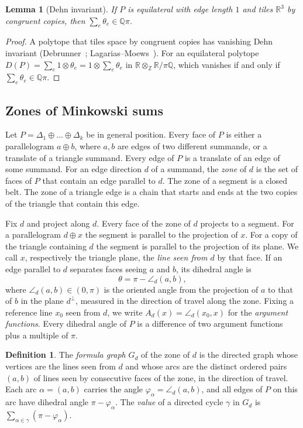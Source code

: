 \documentclass[11pt]{amsart}
\newtheorem{lemma}[thm]{Lemma}
\theoremstyle{definition}
\newtheorem{definition}[thm]{Definition}
\newcommand{\R}{\mathbb{R}}
\newcommand{\Q}{\mathbb{Q}}
\newcommand{\Z}{\mathbb{Z}}
\newcommand{\msum}{\oplus}
\begin{document}
\begin{lemma}[Dehn invariant]\label{lem:dehn}
If $P$ is equilateral with edge length $1$ and tiles $\R^3$ by congruent copies, then $\sum_e \theta_e \in \Q\pi$.
\end{lemma}
\begin{proof}
A polytope that tiles space by congruent copies has vanishing Dehn invariant (Debrunner~\cite{Deb80};
Lagarias--Moews~\cite{LM95}). For an equilateral polytope $D(P)=\sum_e 1\otimes\theta_e = 1\otimes\sum_e\theta_e$ in
$\R\otimes_\Z \R/\pi\Q$, which vanishes if and only if $\sum_e\theta_e\in\Q\pi$.
\end{proof}

\subsection{Zones of Minkowski sums}\label{sec:zones}
Let $P = \Delta_1\msum\dots\msum\Delta_k$ be in general position. Every face of $P$ is either a parallelogram
$a\msum b$, where $a,b$ are edges of two different summands, or a translate of a triangle summand. Every edge of $P$
is a translate of an edge of some summand. For an edge direction $d$ of a summand, the \emph{zone} of $d$ is the set of
faces of $P$ that contain an edge parallel to $d$. The zone of a segment is a closed belt. The zone of a triangle edge
is a chain that starts and ends at the two copies of the triangle that contain this edge.

Fix $d$ and project along $d$. Every face of the zone of $d$ projects to a segment. For a parallelogram $d\msum x$ the
segment is parallel to the projection of $x$. For a copy of the triangle containing $d$ the segment is parallel to the
projection of its plane. We call $x$, respectively the triangle plane, the \emph{line seen from $d$} by that face. If
an edge parallel to $d$ separates faces seeing $a$ and $b$, its dihedral angle is
\begin{equation}\label{eq:angle}
\theta = \pi - \angle_d(a,b),
\end{equation}
where $\angle_d(a,b)\in(0,\pi)$ is the oriented angle from the projection of $a$ to that of $b$ in the plane
$d^\perp$, measured in the direction of travel along the zone. Fixing a reference line $x_0$ seen from $d$, we write
$A_d(x) = \angle_d(x_0,x)$ for the \emph{argument functions}. Every dihedral angle of $P$ is a difference of two
argument functions plus a multiple of $\pi$.

\begin{definition}
The \emph{formula graph} $G_d$ of the zone of $d$ is the directed graph whose vertices are the lines seen from $d$
and whose arcs are the distinct ordered pairs $(a,b)$ of lines seen by consecutive faces of the zone, in the
direction of travel. Each arc $\alpha=(a,b)$ carries the angle $\varphi_\alpha = \angle_d(a,b)$, and all edges of $P$
on this arc have dihedral angle $\pi-\varphi_\alpha$. The \emph{value} of a directed cycle $\gamma$ in $G_d$ is
$\sum_{\alpha\in\gamma}(\pi-\varphi_\alpha)$.
\end{definition}
\end{document}
